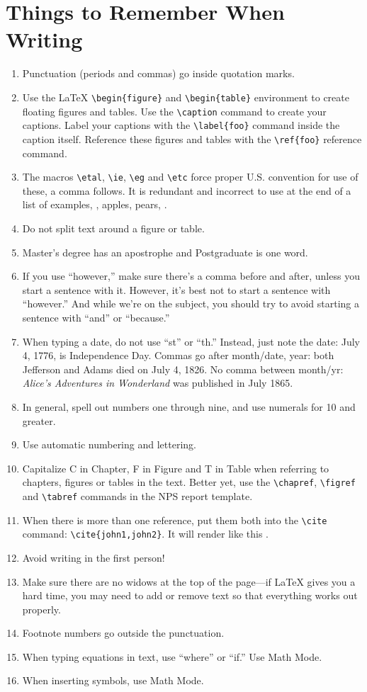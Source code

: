 \section{Things to Remember When Writing}\label{sec:remember}
\begin{enumerate}
\item Punctuation (periods and commas) go inside quotation marks. 
\item Use the \LaTeX{} \verb+\begin{figure}+ and \verb+\begin{table}+ environment to
  create floating figures and tables. Use the \verb+\caption+ command
  to create your captions. Label your captions with the
  \verb+\label{foo}+ command inside the caption itself. Reference
  these figures and tables with the \verb+\ref{foo}+ reference command.
\item The macros \verb+\etal+, \verb+\ie+, \verb+\eg+ and \verb+\etc+ force proper
  U.S. convention for use of these, \ie a comma follows.
  It is redundant and incorrect to use \etc at the end of a list of
  examples, \eg, apples, pears, \etc.
\item Do not split text around a figure or table. 
\item Master's degree has an apostrophe and Postgraduate is one word. 
\item If you use ``however,'' make sure there's a comma before and after,
unless you 
start a sentence with it. However, it's best not to start a sentence
with ``however.'' And while we're on the subject, you should try to avoid starting a sentence with ``and'' or ``because.'' 
\item When typing a date, do not use ``st'' or ``th.'' Instead, just
  note the date: July 4, 1776, is Independence Day. Commas go 
after month/date, year: both Jefferson and Adams died on July 4, 1826.
No comma between month/yr: \textit{Alice's Adventures in Wonderland} was published in July 1865.
\item In general, spell out numbers one through nine, and use numerals for 10 and greater.
\item Use automatic numbering and lettering.
\item Capitalize C in Chapter, F in Figure and T in Table when referring
to chapters, figures or tables in the text. Better yet, use the \verb+\chapref+,
\verb+\figref+ and \verb+\tabref+ commands in the NPS report template.
\item When there is more than one reference, put them both into the \verb+\cite+ command: \verb+\cite{john1,john2}+. It will render like this \cite{IEEEhowto:IEEEtranpage,IEEEexample:shellCTANpage}.
\item Avoid writing in the first person!
\item Make sure there are no widows at the
  top of the page---if \LaTeX{} gives you a hard time, you may need to
  add or remove text so that everything works out properly.
\item Footnote numbers go outside the punctuation. 
\item When typing equations in text, use ``where'' or ``if.'' Use
  Math Mode. 
\item When inserting symbols, use Math Mode.
\end{enumerate}

